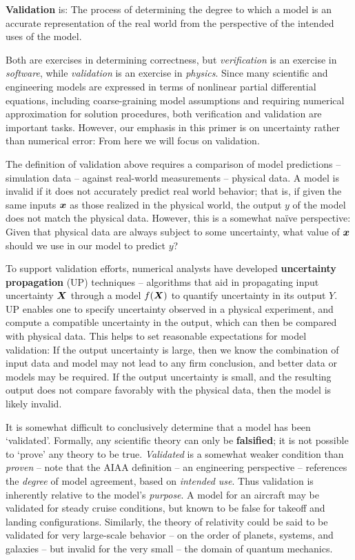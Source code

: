 \documentclass[../primer.tex]{subfiles}
\begin{document}
\textbf{Validation} is: The process of determining the degree to which a model
is an accurate representation of the real world from the perspective of the
intended uses of the model.

Both are exercises in determining correctness, but \emph{verification} is an
exercise in \emph{software}, while \emph{validation} is an exercise in
\emph{physics}. Since many scientific and engineering models are expressed in
terms of nonlinear partial differential equations, including coarse-graining
model assumptions and requiring numerical approximation for solution procedures,
both verification and validation are important tasks. However, our emphasis in
this primer is on uncertainty rather than numerical error: From here we will
focus on validation.

The definition of validation above requires a comparison of model predictions --
simulation data -- against real-world measurements -- physical data. A model is
invalid if it does not accurately predict real world behavior; that is, if given
the same inputs $\boldsymbol{x}$ as those realized in the physical world, the output $y$ of
the model does not match the physical data. However, this is a somewhat na\"ive
perspective: Given that physical data are always subject to some uncertainty,
what value of $\boldsymbol{x}$ should we use in our model to predict $y$?

To support validation efforts, numerical analysts have developed
\textbf{uncertainty propagation} (UP) techniques -- algorithms that aid in
propagating input uncertainty $\boldsymbol{X}$ through a model $f(\boldsymbol{X})$ to quantify
uncertainty in its output $Y$. UP enables one to specify uncertainty observed in
a physical experiment, and compute a compatible uncertainty in the output, which
can then be compared with physical data. This helps to set reasonable
expectations for model validation: If the output uncertainty is large, then we
know the combination of input data and model may not lead to any firm
conclusion, and better data or models may be required. If the output uncertainty
is small, and the resulting output does not compare favorably with the physical
data, then the model is likely invalid.

It is somewhat difficult to conclusively determine that a model has been
`validated'. Formally, any scientific theory can only be \textbf{falsified}; it
is not possible to `prove' any theory to be true.\cite{popper2005logic}
\emph{Validated} is a somewhat weaker condition than \emph{proven} -- note that
the AIAA definition -- an engineering perspective -- references the
\emph{degree} of model agreement, based on \emph{intended use}. Thus validation
is inherently relative to the model's \emph{purpose}. A model for an aircraft
may be validated for steady cruise conditions, but known to be false for takeoff
and landing configurations. Similarly, the theory of relativity could be said to
be validated for very large-scale behavior -- on the order of planets, systems,
and galaxies -- but invalid for the very small -- the domain of quantum
mechanics.
\end{document}
